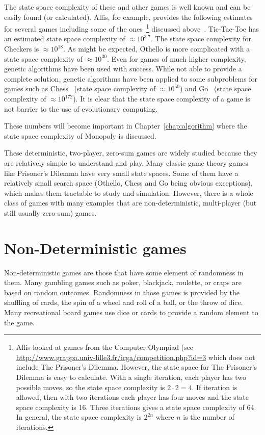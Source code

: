 The state space complexity of these and other games is well known and can be
easily found (or calculated). Allis, for example, provides the following
estimates for several games including some of the ones~\footnote{Allis looked at
games from the Computer Olympiad (see
\url{http://www.grappa.univ-lille3.fr/icga/competition.php?id=3} which does not
include The Prisoner's Dilemma. However, the state space for The Prisoner's
Dilemma is easy to calculate. With a single iteration, each player has two
possible moves, so the state space complexity is \(2\cdot2=4\). If iteration is
allowed, then with two iterations each player has four moves and the state space
complexity is 16. Three iterations gives a state space complexity of 64. In
general, the state space complexity is \(2^{2n}\) where \(n\) is the number of
iterations.} discussed above~\cite{Allis1994}. Tic-Tac-Toe has an estimated
state space complexity of \(\approx10^{3.7}\). The state space complexity for
Checkers is \(\approx10^{18}\). As might be expected, Othello is more
complicated with a state space complexity of \(\approx10^{30}\). Even for games
of much higher complexity, genetic algorithms have been used with success. While
not able to provide a complete solution, genetic algorithms have been applied to
some subproblems for games such as Chess~\cite{Mitsuta:2010:OPG:1994486.1994517}
(state space complexity of \(\approx10^{50}\)) and
Go~\cite{shah2012Go,Blackman2009Go} (state space complexity of
\(\approx10^{172}\)). It is clear that the state space complexity of a game is
not barrier to the use of evolutionary computing.

These numbers will become important in Chapter~\ref{chap:algorithm} where the
state space complexity of Monopoly is discussed.

These deterministic, two-player, zero-sum games are widely studied because
they are relatively simple to understand and play. Many classic game theory
games like Prisoner's Dilemma have very small state spaces. Some of them have a
relatively small search space (Othello, Chess and Go being obvious exceptions),
which makes them tractable to study and simulation. However, there
is a whole class of games with many examples that are non-deterministic,
multi-player (but still usually zero-sum) games.

\section{Non-Deterministic games}

Non-deterministic games are those that have some element of randomness in them.
Many gambling games such as poker, blackjack, roulette, or craps are based
on random outcomes. Randomness in those games is provided by the shuffling of
cards, the spin of a wheel and roll of a ball, or the throw of dice. Many
recreational board games use dice or cards to provide a random element to the
game. 

